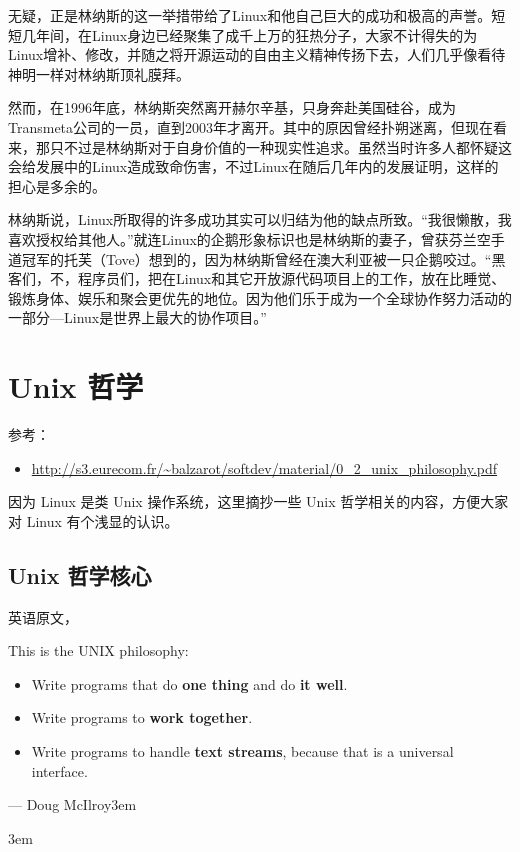 \documentclass[doctor,openright,twoside]{sjtuthesis}
\def\VA#1#2{\addvspace{12pt}\raggedleft #1\rightskip3em\par #2\rightskip3em}
\renewenvironment{quote}
  {\list{}{\rightmargin\leftmargin}%
    \item\relax}
  {\endlist}
\providecommand{\tightlist}{%
    \setlength{\itemsep}{0pt}\setlength{\parskip}{0pt}}
\theoremstyle{plain}
\theoremstyle{definition}
\theoremstyle{remark}
\theoremstyle{ocrenumbox}
\theoremstyle{plain}
\newcommand\cqh{“}
\newcommand\cqt{”}
\begin{document}
无疑，正是林纳斯的这一举措带给了Linux和他自己巨大的成功和极高的声誉。短短几年间，在Linux身边已经聚集了成千上万的狂热分子，大家不计得失的为Linux增补、修改，并随之将开源运动的自由主义精神传扬下去，人们几乎像看待神明一样对林纳斯顶礼膜拜。

然而，在1996年底，林纳斯突然离开赫尔辛基，只身奔赴美国硅谷，成为Transmeta公司的一员，直到2003年才离开。其中的原因曾经扑朔迷离，但现在看来，那只不过是林纳斯对于自身价值的一种现实性追求。虽然当时许多人都怀疑这会给发展中的Linux造成致命伤害，不过Linux在随后几年内的发展证明，这样的担心是多余的。

林纳斯说，Linux所取得的许多成功其实可以归结为他的缺点所致。\cqh 我很懒散，我喜欢授权给其他人。\cqt 就连Linux的企鹅形象标识也是林纳斯的妻子，曾获芬兰空手道冠军的托芙（Tove）想到的，因为林纳斯曾经在澳大利亚被一只企鹅咬过。\cqh 黑客们，不，程序员们，把在Linux和其它开放源代码项目上的工作，放在比睡觉、锻炼身体、娱乐和聚会更优先的地位。因为他们乐于成为一个全球协作努力活动的一部分---Linux是世界上最大的协作项目。\cqt 

\hypertarget{unix-}{%
\section{Unix 哲学}\label{unix-}}

参考：

\begin{itemize}
\tightlist
\item
  \url{http://s3.eurecom.fr/~balzarot/softdev/material/0_2_unix_philosophy.pdf}
\end{itemize}

因为 Linux 是类 Unix 操作系统，这里摘抄一些 Unix
哲学相关的内容，方便大家对 Linux 有个浅显的认识。

\hypertarget{unix-}{%
\subsection{Unix 哲学核心}\label{unix-}}

英语原文，

\begin{quote}
This is the UNIX philosophy:

\begin{itemize}
\tightlist
\item
  Write programs that do \textbf{one thing} and do \textbf{it well}.
\item
  Write programs to \textbf{work together}.
\item
  Write programs to handle \textbf{text streams}, because that is a
  universal interface.
\end{itemize}

\VA{--- Doug McIlroy}{}
\end{quote}
\end{document}
